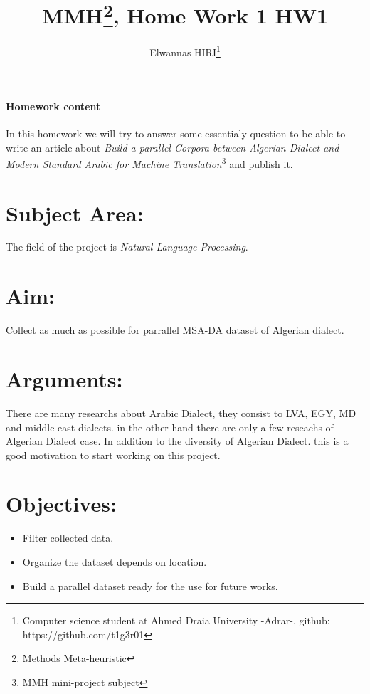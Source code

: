 \documentclass[12pt]{article}[]
\begin{document}
\title{MMH\thanks{Methods Meta-heuristic}, Home Work 1 HW1}
\author{Elwannas HIRI\thanks{Computer science student at Ahmed Draia University -Adrar-, github: https://github.com/t1g3r01}}
\maketitle
\paragraph{Homework content}
In this homework we will try to answer some essentialy question to be able to write an article about \textit{Build a  parallel Corpora between Algerian Dialect and Modern Standard Arabic for Machine Translation}\footnote{MMH mini-project subject} and publish it. 
\section{Subject Area:}
The field of the project is \textit{Natural Language Processing}.
\section{Aim:}
Collect as much as possible for parrallel MSA-DA dataset of Algerian dialect.
\section{Arguments:}
There are many researchs about Arabic Dialect, they consist to LVA, EGY, MD and middle east dialects. in the other hand there are only a few reseachs of Algerian Dialect case. In addition to the diversity of Algerian Dialect. this is a good motivation to start working on this project.   
\section{Objectives:}
\begin{itemize}
	\item Filter collected data.	
	\item Organize the dataset depends on location. 
	\item Build a parallel dataset ready for the use for future works.	
\end{itemize}  
\end{document}
